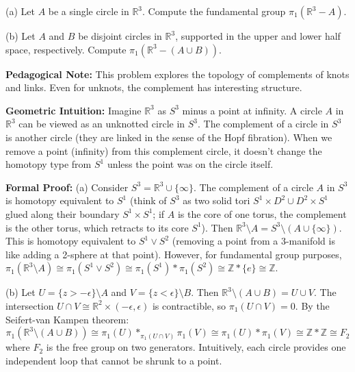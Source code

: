 \begin{exercise}
\label{geometry:2018:8}
(a) Let $A$ be a single circle in $\mathbb{R}^{3}$. Compute the fundamental group $\pi_{1}(\mathbb{R}^{3} - A)$.

(b) Let $A$ and $B$ be disjoint circles in $\mathbb{R}^{3}$, supported in the upper and lower half space, respectively. Compute $\pi_{1}(\mathbb{R}^{3} - (A \cup B))$.
\end{exercise}

\begin{solution}
\textbf{Pedagogical Note:} This problem explores the topology of complements of knots and links. Even for unknots, the complement has interesting structure.

\textbf{Geometric Intuition:}
Imagine $\mathbb{R}^3$ as $S^3$ minus a point at infinity. A circle $A$ in $\mathbb{R}^3$ can be viewed as an unknotted circle in $S^3$. The complement of a circle in $S^3$ is another circle (they are linked in the sense of the Hopf fibration). When we remove a point (infinity) from this complement circle, it doesn't change the homotopy type from $S^1$ unless the point was on the circle itself.

\textbf{Formal Proof:}
(a) Consider $S^3 = \mathbb{R}^3 \cup \{\infty\}$. The complement of a circle $A$ in $S^3$ is homotopy equivalent to $S^1$ (think of $S^3$ as two solid tori $S^1 \times D^2 \cup D^2 \times S^1$ glued along their boundary $S^1 \times S^1$; if $A$ is the core of one torus, the complement is the other torus, which retracts to its core $S^1$).
Then $\mathbb{R}^3 \setminus A = S^3 \setminus (A \cup \{\infty\})$. This is homotopy equivalent to $S^1 \vee S^2$ (removing a point from a 3-manifold is like adding a 2-sphere at that point).
However, for fundamental group purposes, $\pi_1(\mathbb{R}^3 \setminus A) \cong \pi_1(S^1 \vee S^2) \cong \pi_1(S^1) * \pi_1(S^2) \cong \mathbb{Z} * \{e\} \cong \mathbb{Z}$.

(b) Let $U = \{z > - \epsilon\} \setminus A$ and $V = \{z < \epsilon\} \setminus B$. Then $\mathbb{R}^3 \setminus (A \cup B) = U \cup V$. The intersection $U \cap V \cong \mathbb{R}^2 \times (-\epsilon, \epsilon)$ is contractible, so $\pi_1(U \cap V) = 0$. 
By the Seifert-van Kampen theorem:
\[
\pi_1(\mathbb{R}^3 \setminus (A \cup B)) \cong \pi_1(U) *_{\pi_1(U \cap V)} \pi_1(V) \cong \pi_1(U) * \pi_1(V) \cong \mathbb{Z} * \mathbb{Z} \cong F_2
\]
where $F_2$ is the free group on two generators. Intuitively, each circle provides one independent loop that cannot be shrunk to a point.
\end{solution}

